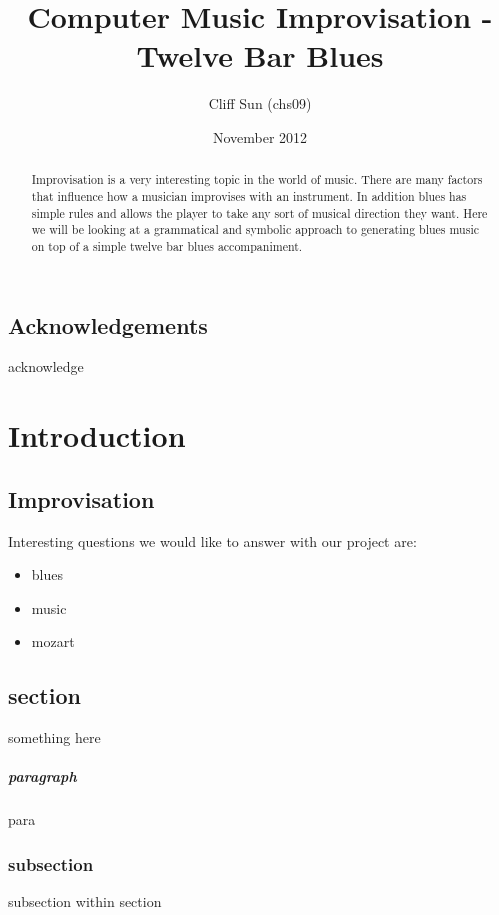 \documentclass[pdftex,12pt,a4paper]{report}
\begin{document}
\title{Computer Music Improvisation - Twelve Bar Blues}
\author{Cliff Sun (chs09)}
\date{November 2012}
\maketitle

\begin{abstract}

Improvisation is a very interesting topic in the world of music. There are many factors that influence how a musician improvises with an instrument. In addition blues has simple rules and allows the player to take any sort of musical direction they want. Here we will be looking at a grammatical and symbolic approach to generating blues music on top of a  simple twelve bar blues accompaniment. 

\end{abstract}

\setcounter{tocdepth}{2} %

\tableofcontents

\pagebreak

\renewcommand*\thesection{\arabic{section}}

\section{Acknowledgements}

acknowledge

\pagebreak

\chapter{Introduction}

\section{Improvisation}

Interesting questions we would like to answer with our project are:
\begin{itemize}

\item blues

\item music

\item mozart

\end{itemize}

\section{section}

something here

\paragraph{paragraph}
para

\subsection{subsection}

subsection within section

\pagebreak
\end{document}
